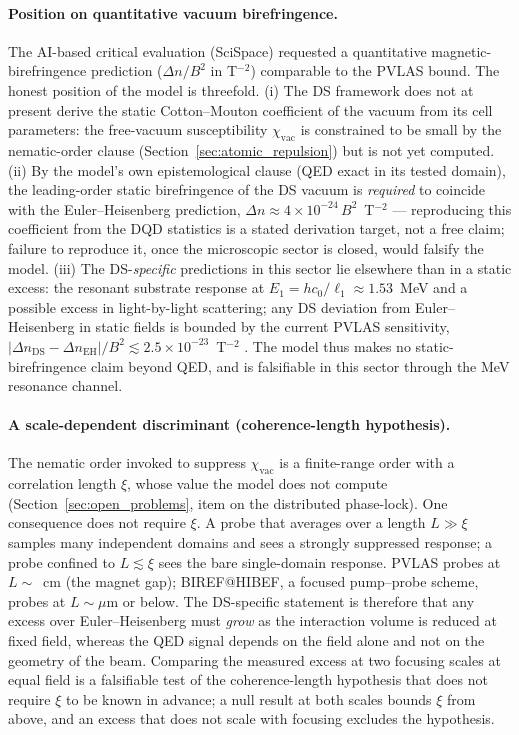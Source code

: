 \documentclass[11pt,a4paper]{article}
\theoremstyle{plain}
\theoremstyle{remark}
\begin{document}
\paragraph{Position on quantitative vacuum birefringence.} The AI-based critical evaluation (SciSpace) requested a quantitative magnetic-birefringence prediction ($\Delta n / B^2$ in T$^{-2}$) comparable to the PVLAS bound. The honest position of the model is threefold. (i) The DS framework does not at present derive the static Cotton--Mouton coefficient of the vacuum from its cell parameters: the free-vacuum susceptibility $\chi_{\text{vac}}$ is constrained to be small by the nematic-order clause (Section~\ref{sec:atomic_repulsion}) but is not yet computed. (ii) By the model's own epistemological clause (QED exact in its tested domain), the leading-order static birefringence of the DS vacuum is \emph{required} to coincide with the Euler--Heisenberg prediction, $\Delta n \approx 4\times10^{-24}\,B^2$~T$^{-2}$ --- reproducing this coefficient from the DQD statistics is a stated derivation target, not a free claim; failure to reproduce it, once the microscopic sector is closed, would falsify the model. (iii) The DS-\emph{specific} predictions in this sector lie elsewhere than in a static excess: the resonant substrate response at $E_1 = h c_0/\ell_1 \approx 1.53$~MeV and a possible excess in light-by-light scattering; any DS deviation from Euler--Heisenberg in static fields is bounded by the current PVLAS sensitivity, $|\Delta n_{\text{DS}} - \Delta n_{\text{EH}}|/B^2 \lesssim 2.5\times10^{-23}$~T$^{-2}$ \cite{PVLAS2020}. The model thus makes no static-birefringence claim beyond QED, and is falsifiable in this sector through the MeV resonance channel.

\paragraph{A scale-dependent discriminant (coherence-length hypothesis).} The nematic order invoked to suppress $\chi_{\text{vac}}$ is a finite-range order with a correlation length $\xi$, whose value the model does not compute (Section~\ref{sec:open_problems}, item on the distributed phase-lock). One consequence does not require $\xi$. A probe that averages over a length $L \gg \xi$ samples many independent domains and sees a strongly suppressed response; a probe confined to $L \lesssim \xi$ sees the bare single-domain response. PVLAS probes at $L \sim$~cm (the magnet gap); BIREF@HIBEF, a focused pump--probe scheme, probes at $L \sim \mu$m or below. The DS-specific statement is therefore that any excess over Euler--Heisenberg must \emph{grow} as the interaction volume is reduced at fixed field, whereas the QED signal depends on the field alone and not on the geometry of the beam. Comparing the measured excess at two focusing scales at equal field is a falsifiable test of the coherence-length hypothesis that does not require $\xi$ to be known in advance; a null result at both scales bounds $\xi$ from above, and an excess that does not scale with focusing excludes the hypothesis.
\end{document}

